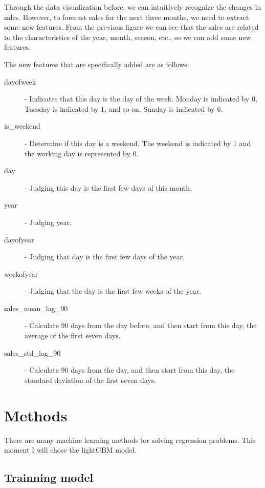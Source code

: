 Through the data visualization before, we can intuitively 
recognize the changes in sales. However, to forecast sales for the 
next three months, we need to extract some new features. From the
previous figure we can see that the sales are related to the 
characteristics of the year, month, season, etc., so we can add some 
new features.

The new features that are specifically added are as follows:
\ 
\begin{description}
  \item [dayofweek] -  Indicates that this day is the day of the week. Monday is \hspace*{1.8cm} indicated by 0, Tuesday is indicated by 1, and so on.
                       Sunday \hspace*{1.8cm} is indicated by 6.
  \item [is\_weekend] - Determine if this day is a weekend. The weekend is indicated \hspace*{1.85cm} by 1 and the working day is represented by 0.
  \item [day] - Judging this day is the first few days of this month.
  \item [year] - Judging year.
  \item [dayofyear] - Judging that day is the first few days of the year.
  \item [weekofyear] - Judging that the day is the first few weeks of the year.
  \item [sales\_mean\_lag\_90] - Calculate 90 days from the day before, and then start \hspace*{3.1cm} from this day, the average of the first 
  seven days.
  \item [sales\_std\_lag\_90] - Calculate 90 days from the day, and then start from this \hspace*{2.7cm} day, the standard deviation of the 
  first seven days.
\end{description}

\section{Methods}

There are many machine learning methods for solving regression problems. This moment I will chose the lightGBM model.

\subsection{Trainning model}
\ 

